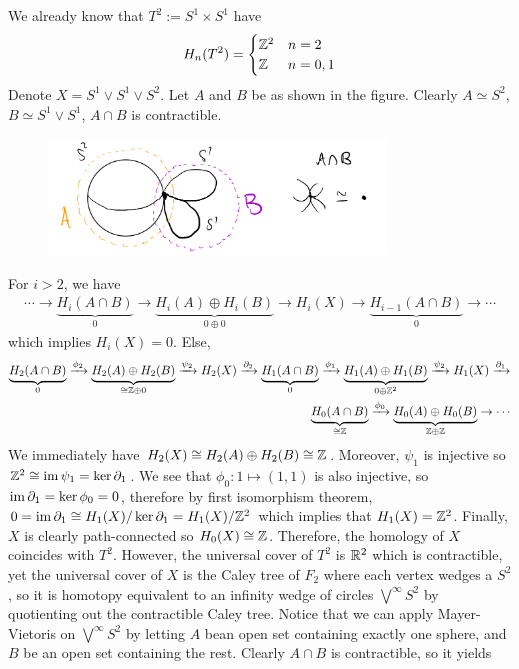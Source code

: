 \documentclass[12pt]{article}
\begin{document}
\begin{problem}[9]
We already know that $ T^2 := S^{1} \times S^{1}$ have
\begin{align*}
	H_n(T^2) &= \begin{cases}
		\mathbb{Z}^2 & n =2\\
		\mathbb{Z} & n=0,1\\
	\end{cases} \\
\end{align*}
Denote $ X = S^{1} \vee S^{1} \vee S^{2}$. Let $ A$ and  $ B$ be as shown in the figure. Clearly  $ A \simeq S^2$, $ B \simeq S^{1} \vee S^{1}$, $ A \cap B$ is contractible.
~\begin{figure}[H]
	\centering
	\includegraphics[width=0.8\textwidth]{./figures/MV_wedge.png}
\end{figure}
For $ i>2$, we have
\begin{align*}
	\cdots \to \underbrace{ H_i(A \cap B)}_{0 }  \to \underbrace{ H_i(A) \oplus H_i(B) }_{ 0 \oplus 0} \to H_i(X) \to \underbrace{ H_{i-1}(A \cap B)}_{ 0}  \to \cdots
\end{align*}
which implies $ H_i(X) = 0$. Else,
\begin{align*}
	\underbrace{ H_2(A \cap B)}_{ 0} \xrightarrow{ \phi_2}  \underbrace{ H_2(A) \oplus H_2(B)}_{ \cong \mathbb{Z} \oplus 0} \xrightarrow{ \psi_2}  H_2(X) \xrightarrow{ \partial_2}  \underbrace{ H_1(A \cap B)}_{ 0} \xrightarrow{ \phi_1}  \underbrace{ H_1(A) \oplus H_1(B)}_{ 0 \oplus \mathbb{Z}^2} \xrightarrow{ \psi_2}  H_1(X) \xrightarrow{ \partial _1}\\  
	\underbrace{ H_0(A \cap B)}_{ \cong \mathbb{Z}} \xrightarrow{ \phi_0} \underbrace{ H_0(A) \oplus H_0(B)}_{ \mathbb{Z} \oplus \mathbb{Z}} \to \cdots   
\end{align*}
We immediately have $ H_2(X) \cong H_2(A)\oplus H_2(B) \cong \mathbb{Z}$. Moreover, $ \psi_1$ is injective so $ \mathbb{Z}^2 \cong \operatorname{im} \psi_1 = \ker \partial _1 $. We see that $ \phi_0:1 \mapsto (1,1)$ is also injective, so $ \operatorname{im} \partial _1 = \ker \phi_0 = 0$, therefore by first isomorphism theorem, $ 0 = \operatorname{im} \partial _1 \cong H_1(X) / \ker \partial _1 =  H_1(X) / \mathbb{Z}^2$ which implies that $ H_1(X) = \mathbb{Z}^2$. Finally, $ X$ is clearly path-connected so  $ H_0(X) \cong \mathbb{Z}$. Therefore, the homology of $ X$ coincides with  $ T^2$. However, the universal cover of $ T^2$ is $ \mathbb{R}^2$ which is contractible, yet the universal cover of $ X$ is the Caley tree of  $ F_2$ where each vertex wedges a $ S^2$, so it is homotopy equivalent to an infinity wedge of circles $ \bigvee^{ \infty} S^2$ by quotienting out the contractible Caley tree. Notice that we can apply Mayer-Vietoris on $ \bigvee^ \infty S^2 $ by letting $ A $ bean open set containing exactly one sphere, and  $ B$ be an open set containing the rest. Clearly  $ A \cap B$ is contractible, so it yields

\end{problem}
\end{document}

